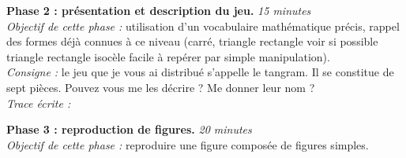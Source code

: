 \begin{exercice*}
{\bf Phase 2 : présentation et description du jeu.} \hfill {\it  15 minutes} \\
{\it Objectif de cette phase :} utilisation d’un vocabulaire mathématique précis, rappel des formes déjà connues à ce niveau (carré, triangle rectangle voir si possible triangle rectangle isocèle facile à repérer
par simple manipulation). \\
{\it Consigne :} le jeu que je vous ai distribué s’appelle le tangram. Il se constitue de sept pièces. Pouvez vous me les décrire ? Me donner leur nom ? \\
{\it Trace écrite :}
\begin{center}
\end{center}

\bigskip

{\bf Phase 3 : reproduction de figures.}  \hfill {\it 20 minutes} \\
{\it Objectif de cette phase :} reproduire une figure composée de figures simples. \\ [-3mm]


\end{exercice*}
